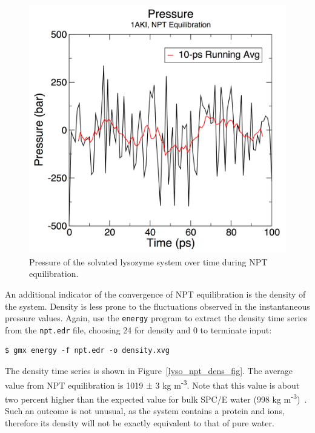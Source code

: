 \documentclass[9pt,tutorial]{livecoms}
\begin{document}
\begin{figure}[h]
\centering
\includegraphics{plot_lyso_npt_pressure}
\caption{Pressure of the solvated lysozyme system over time during NPT equilibration.}
\label{lyso_npt_pres_fig}
\end{figure}

An additional indicator of the convergence of NPT equilibration is the density of the system. Density is less prone to the fluctuations observed in the instantaneous pressure values. Again, use the \texttt{energy} program to extract the density time series from the \texttt{npt.edr} file, choosing 24 for density and 0 to terminate input:

\begin{verbatim}
$ gmx energy -f npt.edr -o density.xvg
\end{verbatim}

The density time series is shown in Figure~\ref{lyso_npt_dens_fig}. The average value from NPT equilibration is 1019 $\pm$ 3 kg m\textsuperscript{-3}. Note that this value is about two percent higher than the expected value for bulk SPC/E water (998 kg m\textsuperscript{-3})~\cite{Berendsen1987}. Such an outcome is not unusual, as the system contains a protein and ions, therefore its density will not be exactly equivalent to that of pure water.
\end{document}
